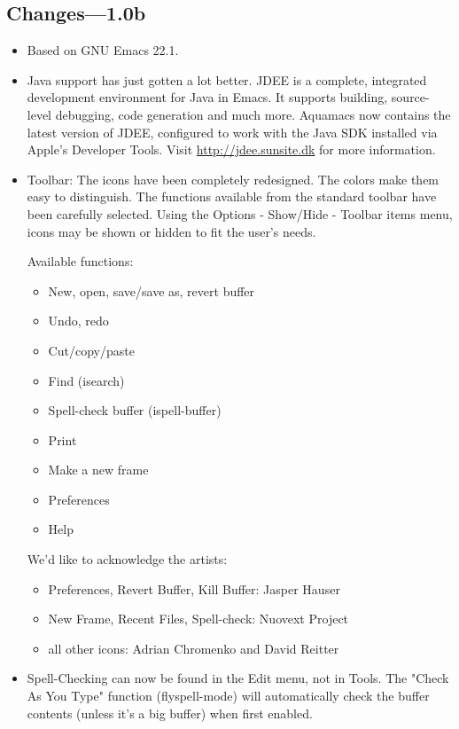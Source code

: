 \subsection{Changes---1.0b}


\begin{itemize}
	
\item Based on GNU Emacs 22.1.

\item Java support has just gotten a lot better. JDEE is a complete,
	integrated development environment for Java in Emacs. It supports
	building, source-level debugging, code generation and much
	more. Aquamacs now contains the latest version of JDEE, configured
	to work with the Java SDK installed via Apple's Developer
	Tools. Visit \url{http://jdee.sunsite.dk} for more information.

\item Toolbar: The icons have been completely redesigned. The colors
	make them easy to distinguish.  The functions available from the
	standard toolbar have been carefully selected. 
	Using the Options - Show/Hide - Toolbar items menu,
	icons may be shown or hidden to fit the user's needs.

	Available functions:
        \begin{itemize}
	\item New, open, save/save as, revert buffer
	\item Undo, redo
	\item Cut/copy/paste
	\item Find (isearch)
	\item Spell-check buffer (ispell-buffer)
	\item Print
	\item Make a new frame
	\item Preferences
	\item Help
	\end{itemize}

	We'd like to acknowledge the artists:
        \begin{itemize}
	\item Preferences, Revert Buffer, Kill Buffer: Jasper Hauser
	\item New Frame, Recent Files, Spell-check: Nuovext Project
	\item all other icons: Adrian Chromenko and David Reitter
         \end{itemize}

\item Spell-Checking can now be found in the Edit menu, not in
	Tools. The "Check As You Type" function (flyspell-mode) will
	automatically check the buffer contents (unless it's a big buffer)
	when first enabled.
	

\end{itemize}
